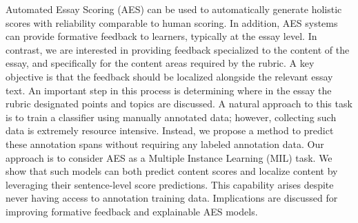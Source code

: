 Automated Essay Scoring (AES) can be used to automatically generate holistic scores with reliability comparable to human scoring. In addition, AES systems can provide formative feedback to learners, typically at the essay level. In contrast, we are interested in providing feedback specialized to the content of the essay, and specifically for the content areas required by the rubric. A key objective is that the feedback should be localized alongside the relevant essay text. An important step in this process is determining where in the essay the rubric designated points and topics are discussed. A natural approach to this task is to train a classifier using manually annotated data; however, collecting such data is extremely resource intensive. Instead, we propose a method to predict these annotation spans without requiring any labeled annotation data. Our approach is to consider AES as a Multiple Instance Learning (MIL) task. We show that such models can both predict content scores and localize content by leveraging their sentence-level score predictions. This capability arises despite never having access to annotation training data. Implications are discussed for improving formative feedback and explainable AES models.
